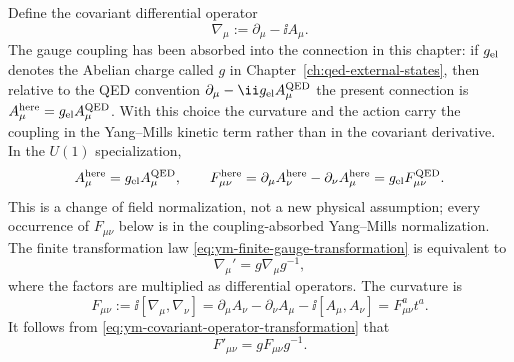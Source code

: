 Define the covariant differential operator
\begin{equation}
  \nabla_\mu:=\partial_\mu-\ii A_\mu .
  \label{eq:ym-adjoint-covariant-operator}
\end{equation}
The gauge coupling has been absorbed into the connection in this chapter:
if \(g_{\rm el}\) denotes the Abelian charge called \(g\) in
Chapter~\ref{ch:qed-external-states}, then relative to the QED convention
\(\partial_\mu-\ii g_{\rm el} A_\mu^{\rm QED}\) the present connection is
\(A_\mu^{\rm here}=g_{\rm el}A_\mu^{\rm QED}\).  With this choice the
curvature and the action carry the coupling in the Yang--Mills kinetic term
rather than in the covariant derivative.  In the \(U(1)\) specialization,
\begin{equation}
  A_\mu^{\rm here}=g_{\rm el}A_\mu^{\rm QED},
  \qquad
  F_{\mu\nu}^{\rm here}
  =
  \partial_\mu A_\nu^{\rm here}-\partial_\nu A_\mu^{\rm here}
  =
  g_{\rm el}F_{\mu\nu}^{\rm QED}.
  \label{eq:ym-qed-curvature-rescaling}
\end{equation}
This is a change of field normalization, not a new physical assumption; every
occurrence of \(F_{\mu\nu}\) below is in the coupling-absorbed Yang--Mills
normalization.
The finite transformation law \eqref{eq:ym-finite-gauge-transformation} is
equivalent to
\begin{equation}
  \nabla_\mu'=g\nabla_\mu g^{-1},
  \label{eq:ym-covariant-operator-transformation}
\end{equation}
where the factors are multiplied as differential operators.  The curvature is
\begin{equation}
  F_{\mu\nu}
  :=
  \ii[\nabla_\mu,\nabla_\nu]
  =
  \partial_\mu A_\nu-\partial_\nu A_\mu-\ii[A_\mu,A_\nu]
  =
  F^a_{\mu\nu}t^a .
  \label{eq:ym-field-strength-definition}
\end{equation}
It follows from \eqref{eq:ym-covariant-operator-transformation} that
\begin{equation}
  F'_{\mu\nu}=gF_{\mu\nu}g^{-1}.
  \label{eq:ym-curvature-covariance}
\end{equation}

